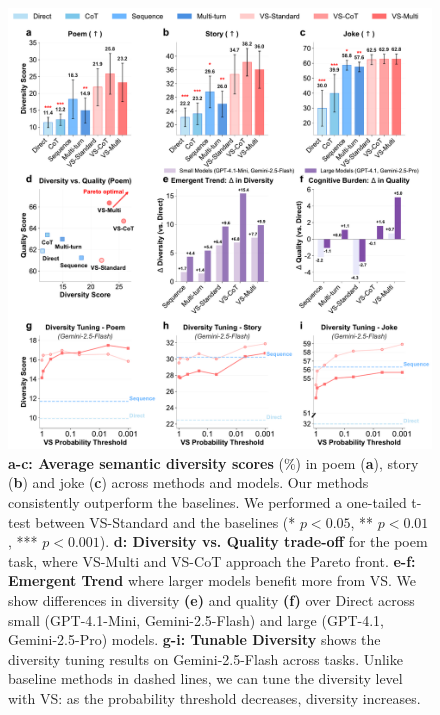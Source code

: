 \begin{figure}[t]
    \centering
    \includegraphics[width=1\linewidth]{figures/creative_writing/unified_creativity_w_diversity_tuning.pdf}
    \caption{
    \textbf{a-c: Average semantic diversity scores} (\%) in poem  (\textbf{a}), story (\textbf{b}) and joke (\textbf{c}) across methods and models. Our methods consistently outperform the baselines. We performed a one-tailed t-test between VS-Standard and the baselines (* $p<0.05$, ** $p<0.01$, *** $p<0.001$). 
    \textbf{d: Diversity vs. Quality trade-off} for the poem task, where VS-Multi and VS-CoT approach the Pareto front. \textbf{e-f: Emergent Trend} where larger models benefit more from VS. We show differences in diversity \textbf{(e)} and quality \textbf{(f)} over Direct across small (GPT-4.1-Mini, Gemini-2.5-Flash) and large (GPT-4.1, Gemini-2.5-Pro) models. 
    \textbf{g-i: Tunable Diversity} shows the diversity tuning results on Gemini-2.5-Flash across tasks. Unlike baseline methods in dashed lines, we can tune the diversity level with VS: as the probability threshold decreases, diversity increases.
}
\end{figure}
